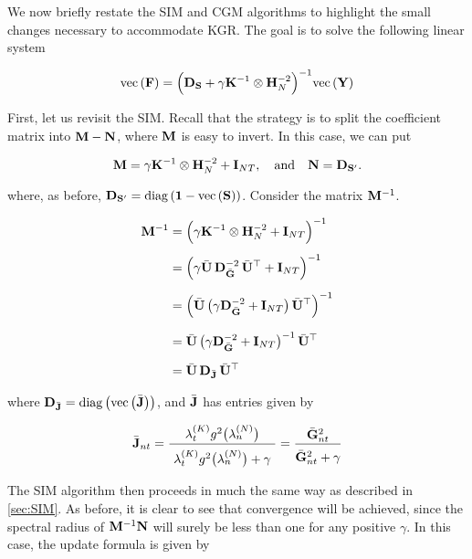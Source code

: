 We now briefly restate the SIM and CGM algorithms to highlight the small changes necessary to accommodate KGR. The goal is to solve the following linear system 

\begin{equation}
    \label{eq:lin_system_kgr}
    \text{\textup{vec}}\left(\mathbf{F}\right) = \Big(\mathbf{D}_{\mathbf{S}} + \gamma \mathbf{K}^{-1} \otimes \mathbf{H}_N^{-2}\Big)^{-1} \text{\textup{vec}}\left(\mathbf{Y}\right)
\end{equation}

First, let us revisit the SIM. Recall that the strategy is to split the coefficient matrix into $\mathbf{M} - \mathbf{N}$, where $\mathbf{M}$ is easy to invert. In this case, we can put

\begin{equation}
    \mathbf{M} = \gamma \mathbf{K}^{-1} \otimes \mathbf{H}_N^{-2} + \mathbf{I}_{NT}, \quad \text{and} \quad \mathbf{N} = \mathbf{D}_{\mathbf{S}'}.
\end{equation}

where, as before, $\mathbf{D}_{\mathbf{S}'} = \text{\textup{diag}}\left(\mathbf{1} - \text{\textup{vec}}\left(\mathbf{S}\right)\right)$. Consider the matrix $\mathbf{M}^{-1}$.

\begin{align}
    \label{eq:M_inv_kgr}
    \mathbf{M}^{-1} &= \Big(\gamma \mathbf{K}^{-1} \otimes \mathbf{H}_N^{-2} + \mathbf{I}_{NT}\Big)^{-1} \notag \\[0.15cm]
    &= \Big(\gamma \bar{\mathbf{U}} \, \mathbf{D}_{\bar{\mathbf{G}}}^{-2} \, \bar{\mathbf{U}}^\top + \mathbf{I}_{NT}\Big)^{-1} \notag \\[0.2cm]
    &= \Big(\bar{\mathbf{U}} \, \big( \gamma \mathbf{D}_{\bar{\mathbf{G}}}^{-2} + \mathbf{I}_{NT} \big) \, \bar{\mathbf{U}}^\top\Big)^{-1} \notag \\[0.25cm]
    &= \bar{\mathbf{U}} \, \big( \gamma \mathbf{D}_{\bar{\mathbf{G}}}^{-2} + \mathbf{I}_{NT} \big)^{-1} \, \bar{\mathbf{U}}^\top \notag \\[0.2cm]
    &= \bar{\mathbf{U}} \, \mathbf{D}_{\bar{\mathbf{J}}} \, \bar{\mathbf{U}}^\top 
\end{align}

where $\mathbf{D}_{\bar{\mathbf{J}}} = \text{\textup{diag}}\left(\text{\textup{vec}}\left(\bar{\mathbf{J}}\right)\right)$, and $\bar{\mathbf{J}}$ has entries given by 

\begin{equation}
    \label{eq:Jnt2}
    \bar{\J}_{nt} = \frac{\lambda^{(K)}_t g^2\big(\lambda_n^{(N)}\big)}{ \raisebox{-0.2cm} { $\lambda^{(K)}_t g^2\big(\lambda_n^{(N)}\big) + \gamma$ } } = \frac{\bar{\G}_{nt}^2}{ \raisebox{-0.15cm} {$\bar{\G}_{nt}^2 + \gamma$}}
\end{equation}

The SIM algorithm then proceeds in much the same way as described in \cref{sec:SIM}. As before, it is clear to see that convergence will be achieved, since the spectral radius of $\mathbf{M}^{-1}\mathbf{N}$ will surely be less than one for any positive $\gamma$. In this case, the update formula is given by 

